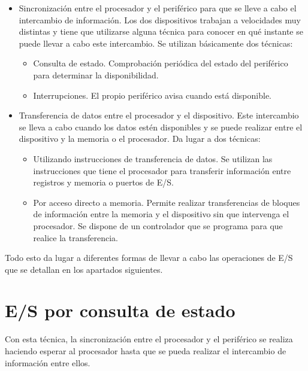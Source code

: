 \begin{itemize}
	\item Sincronización entre el procesador y el periférico para que se lleve a cabo el intercambio de información. Los dos  dispositivos trabajan a velocidades muy distintas y  tiene que utilizarse alguna técnica para conocer en qué instante se puede llevar a cabo este intercambio. Se utilizan b\'asicamente dos técnicas:
	
	\begin{itemize}
		\item Consulta de estado. Comprobación periódica del estado del periférico para determinar la disponibilidad.
		\item Interrupciones. El propio periférico avisa cuando está disponible. 
	\end{itemize}
	
	\item Transferencia de datos entre el procesador y el dispositivo. Este intercambio se lleva a cabo cuando los datos estén disponibles y se puede realizar entre el dispositivo y la memoria o el procesador. Da lugar a dos técnicas:
	
	\begin{itemize}
		\item Utilizando instrucciones de transferencia de datos. Se utilizan las instrucciones que tiene el procesador para transferir información entre registros y memoria o puertos de E/S.  
		\item Por acceso directo a memoria. Permite realizar transferencias de bloques de información entre la memoria y el dispositivo sin que intervenga el procesador. Se dispone de un controlador que se programa para que realice la transferencia. 
	\end{itemize}
\end{itemize}

Todo esto da lugar a diferentes formas de llevar a cabo las operaciones de E/S que se detallan en los apartados siguientes. 

\section{E/S por consulta de estado}
Con esta técnica, la sincronización entre el procesador y el periférico se realiza haciendo esperar al procesador hasta que se pueda realizar el intercambio de información entre ellos. 

